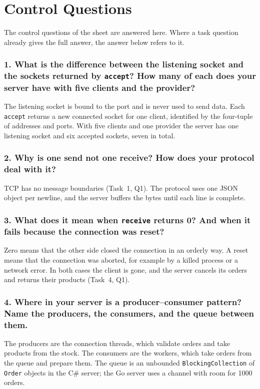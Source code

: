 \documentclass[12pt,a4paper]{article}
\begin{document}
\section{Control Questions}
\label{sec:control}

The control questions of the sheet are answered here. Where a task question already
gives the full answer, the answer below refers to it.

    \subsubsection{1. What is the difference between the listening socket and the sockets returned by \texttt{accept}? How many of each does your server have with five clients and the provider?}
    The listening socket is bound to the port and is never used to send data. Each
    \texttt{accept} returns a new connected socket for one client, identified by the
    four-tuple of addresses and ports. With five clients and one provider the server has
    one listening socket and six accepted sockets, seven in total.

    \subsubsection{2. Why is one send not one receive? How does your protocol deal with it?}
    TCP has no message boundaries (Task~1, Q1). The protocol uses one JSON object per
    newline, and the server buffers the bytes until each line is complete.

    \subsubsection{3. What does it mean when \texttt{receive} returns 0? And when it fails because the connection was reset?}
    Zero means that the other side closed the connection in an orderly way. A reset means
    that the connection was aborted, for example by a killed process or a network error.
    In both cases the client is gone, and the server cancels its orders and returns their
    products (Task~4, Q1).

    \subsubsection{4. Where in your server is a producer--consumer pattern? Name the producers, the consumers, and the queue between them.}
    The producers are the connection threads, which validate orders and take products from
    the stock. The consumers are the workers, which take orders from the queue and prepare
    them. The queue is an unbounded \texttt{BlockingCollection} of \texttt{Order} objects in
    the C\# server; the Go server uses a channel with room for 1000 orders.
\end{document}
